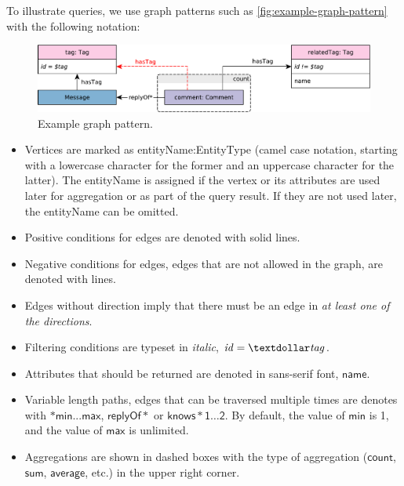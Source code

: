To illustrate queries, we use graph patterns such as \autoref{fig:example-graph-pattern} with the following notation:

\begin{figure}[ht]
	\begin{center}
		\includegraphics[scale=\patternscale,margin=0cm .2cm]{patterns/bi-read-08}
		\caption{Example graph pattern.}
		\label{fig:example-graph-pattern}
	\end{center}
\end{figure}

\begin{itemize}
	\item Vertices are marked as \textsf{entityName:EntityType} (camel case notation, starting with a lowercase character for the former and an uppercase character for the latter). The \textsf{entityName} is assigned if the vertex or its attributes are used later for aggregation or as part of the query result. If they are not used later, the \textsf{entityName}  can be omitted.
	\item Positive conditions for edges are denoted with solid lines.
	\item Negative conditions for edges, \ie edges that are not allowed in the graph, are denoted with \textcolor{red}{} lines.
	\item Edges without direction imply that there must be an edge in \emph{at least one of the directions}.
	\item Filtering conditions are typeset in \textit{italic}, \eg $\mathit{id} = \mathit{\textdollar tag}$.
	\item Attributes that should be returned are denoted in sans-serif font, \eg $\mathsf{name}$.
	\item Variable length paths, \ie edges that can be traversed multiple times are denotes with $*\mathsf{min}...\mathsf{max}$, \eg $\mathsf{replyOf}*$ or $\mathsf{knows*1 \ldots 2}$. By default, the value of $\mathsf{min}$ is 1, and the value of $\mathsf{max}$ is unlimited.
	\item Aggregations are shown in dashed boxes with the type of aggregation ($\mathsf{count}$, $\mathsf{sum}$, $\mathsf{average}$, etc.) in the upper right corner.
\end{itemize}

